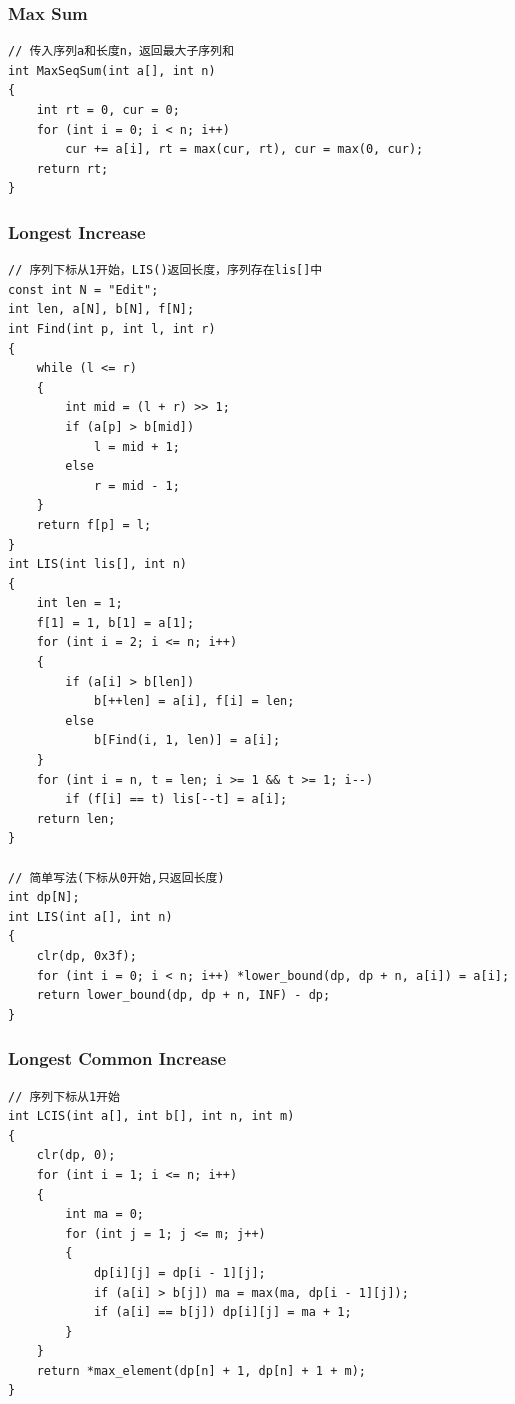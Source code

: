 \documentclass[twoside]{article}
\begin{document}
\subsubsection{Max Sum}
\begin{lstlisting}
// 传入序列a和长度n，返回最大子序列和
int MaxSeqSum(int a[], int n)
{
    int rt = 0, cur = 0;
    for (int i = 0; i < n; i++)
        cur += a[i], rt = max(cur, rt), cur = max(0, cur);
    return rt;
}
\end{lstlisting}
\subsubsection{Longest Increase}
\begin{lstlisting}
// 序列下标从1开始，LIS()返回长度，序列存在lis[]中
const int N = "Edit";
int len, a[N], b[N], f[N];
int Find(int p, int l, int r)
{
    while (l <= r)
    {
        int mid = (l + r) >> 1;
        if (a[p] > b[mid])
            l = mid + 1;
        else
            r = mid - 1;
    }
    return f[p] = l;
}
int LIS(int lis[], int n)
{
    int len = 1;
    f[1] = 1, b[1] = a[1];
    for (int i = 2; i <= n; i++)
    {
        if (a[i] > b[len])
            b[++len] = a[i], f[i] = len;
        else
            b[Find(i, 1, len)] = a[i];
    }
    for (int i = n, t = len; i >= 1 && t >= 1; i--)
        if (f[i] == t) lis[--t] = a[i];
    return len;
}

// 简单写法(下标从0开始,只返回长度)
int dp[N];
int LIS(int a[], int n)
{
    clr(dp, 0x3f);
    for (int i = 0; i < n; i++) *lower_bound(dp, dp + n, a[i]) = a[i];
    return lower_bound(dp, dp + n, INF) - dp;
}
\end{lstlisting}
\subsubsection{Longest Common Increase}
\begin{lstlisting}
// 序列下标从1开始
int LCIS(int a[], int b[], int n, int m)
{
    clr(dp, 0);
    for (int i = 1; i <= n; i++)
    {
        int ma = 0;
        for (int j = 1; j <= m; j++)
        {
            dp[i][j] = dp[i - 1][j];
            if (a[i] > b[j]) ma = max(ma, dp[i - 1][j]);
            if (a[i] == b[j]) dp[i][j] = ma + 1;
        }
    }
    return *max_element(dp[n] + 1, dp[n] + 1 + m);
}
\end{lstlisting}
\end{document}
